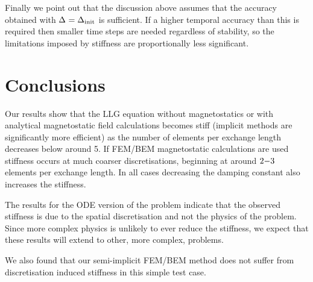 Finally we point out that the discussion above assumes that the accuracy obtained with $\Delta_{} = \Delta_{\mathrm{init}}$ is sufficient.
If a higher temporal accuracy than this is required then smaller time steps are needed regardless of stability, so the limitations imposed by stiffness are proportionally less significant.


\section{Conclusions}
Our results show that the LLG equation without magnetostatics or with analytical magnetostatic field calculations becomes stiff (\ie implicit methods are significantly more efficient) as the number of elements per exchange length decreases below around 5.
If FEM/BEM magnetostatic calculations are used stiffness occurs at much coarser discretisations, beginning at around $2\mathrm{-} 3$ elements per exchange length.
In all cases decreasing the damping constant also increases the stiffness.

The results for the ODE version of the problem indicate that the observed stiffness is due to the spatial discretisation and not the physics of the problem.
Since more complex physics is unlikely to ever reduce the stiffness, we expect that these results will extend to other, more complex, problems.

We also found that our semi-implicit FEM/BEM method does not suffer from discretisation induced stiffness in this simple test case.


